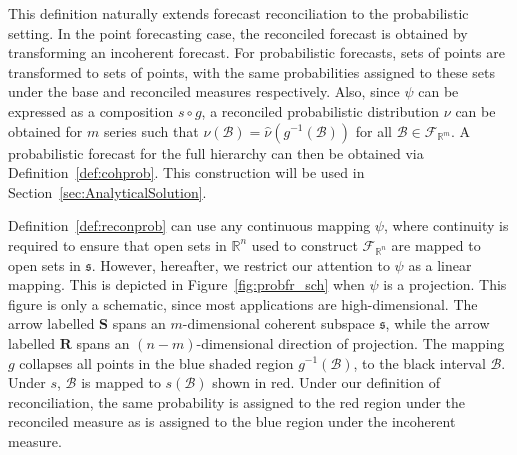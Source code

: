 \documentclass[a4paper,12pt]{article}
\theoremstyle{definition}
\begin{document}
This definition naturally extends forecast reconciliation to the probabilistic setting. In the point forecasting case, the reconciled forecast is obtained by transforming an incoherent forecast. For probabilistic forecasts, sets of points are transformed to sets of points, with the same probabilities assigned to these sets under the base and reconciled measures respectively. Also, since $\psi$ can be expressed as a composition $s\circ g$, a reconciled probabilistic distribution $\nu$ can be obtained for $m$ series such that $\nu(\mathcal{B})= \hat{\nu}(g^{-1}(\mathcal{B}))$ for all $\mathcal{B} \in \mathscr{F}_{\mathbb{R}^m}$. A probabilistic forecast for the full hierarchy can then be obtained via Definition~\ref{def:cohprob}. This construction will be used in Section~\ref{sec:AnalyticalSolution}.

Definition~\ref{def:reconprob} can use any continuous mapping $\psi$, where continuity is required to ensure that open sets in $\mathbb{R}^n$ used to construct $\mathscr{F}_{\mathbb{R}^n}$ are mapped to open sets in $\mathfrak{s}$. However, hereafter, we restrict our attention to $\psi$ as a linear mapping. This is depicted in Figure~\ref{fig:probfr_sch} when $\psi$ is a projection. This figure is only a schematic, since most applications are high-dimensional. The arrow labelled $\bm{S}$ spans an $m$-dimensional coherent subspace $\mathfrak{s}$, while the arrow labelled $\bm{R}$ spans an $(n-m)$-dimensional direction of projection. The mapping $g$ collapses all points in the blue shaded region $g^{-1}(\mathcal{B})$, to the black interval $\mathcal{B}$. Under $s$, $\mathcal{B}$ is mapped to $s(\mathcal{B})$ shown in red. Under our definition of reconciliation, the same probability is assigned to the red region under the reconciled measure as is assigned to the blue region under the incoherent measure.
\end{document}

